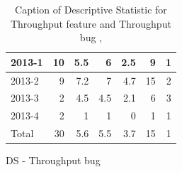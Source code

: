 \documentclass[UKenglish]{ifimaster}  %
\begin{document}
\begin{appendices}
\begin{table}[!htbp]
\begin{adjustwidth}{-1.5cm}{}
\begin{subfigure}[b]{0.3\textwidth}
{\begin{tabular}{ | l | r | r | r | r | r | r | }
 2013-1  & 10 & 5.5 & 6 & 2.5 & 9 & 1 \\ \hline
 2013-2  & 9 & 7.2 & 7 & 4.7 & 15 & 2 \\ \hline
 2013-3  & 2 & 4.5 & 4.5 & 2.1 & 6 & 3 \\ \hline
 2013-4  & 2 & 1 & 1 & 0 &1 & 1 \\ \hline
 Total  & 30 & 5.6 & 5.5 & 3.7 & 15 & 1 \\ \hline
\end{tabular}
}
\caption{DS - Throughput bug}
 \label{DS:TPB:4}
\end{subfigure}
\end{adjustwidth}
\caption[Optional caption for list of figures]{Caption of Descriptive Statistic for Throughput feature and Throughput bug  , }
\label{DS:4:2}
\end{table}



\begin{table}[!htbp]
  \begin{adjustwidth}{-2.5cm}{}
\begin{subfigure}[b]{0.7\textwidth}
\end{subfigure}
\end{adjustwidth}
\end{table}
\end{appendices}
\end{document}
